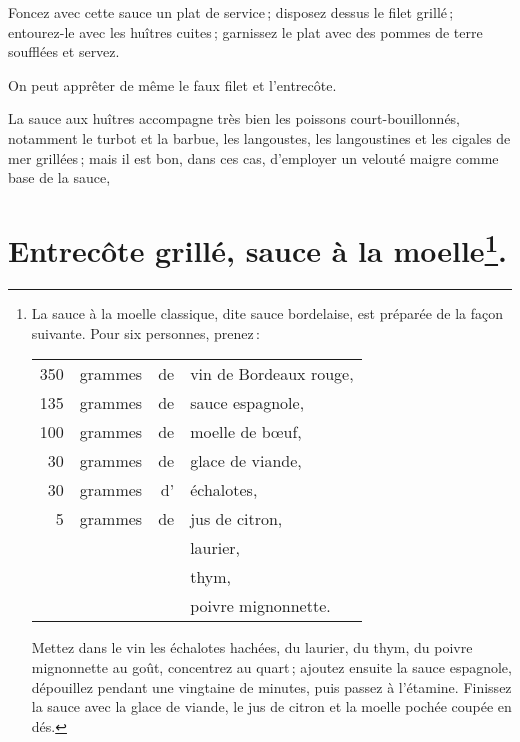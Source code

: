 Foncez avec cette sauce un plat de service ; disposez dessus le filet grillé ;
entourez-le avec les huîtres cuites ; garnissez le plat avec des pommes de
terre soufflées et servez.

\sk

On peut apprêter de même le faux filet et l'entrecôte.

\sk

La sauce aux huîtres accompagne très bien les poissons court-bouillonnés,
notamment le turbot et la barbue, les langoustes, les langoustines et les
cigales de mer grillées ; mais il est bon, dans ces cas, d'employer un velouté
maigre comme base de la sauce,

\section*{\centering Entrecôte grillé, sauce à la moelle\footnote{La sauce à la
moelle classique, dite sauce bordelaise, est préparée de la façon suivante.
\protect\endgraf
Pour six personnes, prenez :
\protect\endgraf
\begin{longtable}{rrrp{16em}}
    350 & grammes & de & vin de Bordeaux rouge,                                                           \\
    135 & grammes & de & sauce espagnole,                                                                 \\
    100 & grammes & de & moelle de bœuf,                                                                  \\
     30 & grammes & de & glace de viande,                                                                 \\
     30 & grammes & d' & échalotes,                                                                       \\
      5 & grammes & de & jus de citron,                                                                   \\
        &         &    & laurier,                                                                         \\
        &         &    & thym,                                                                            \\
        &         &    & poivre mignonnette.                                                              \\
\end{longtable}
\protect\endgraf
Mettez dans le vin les échalotes hachées, du laurier, du thym, du poivre mignonnette au goût, concentrez
au quart ; ajoutez ensuite la sauce espagnole, dépouillez pendant une vingtaine de minutes, puis passez à
l'étamine.
\protect\endgraf
Finissez la sauce avec la glace de viande, le jus de citron et la moelle pochée coupée en dés.}.}


